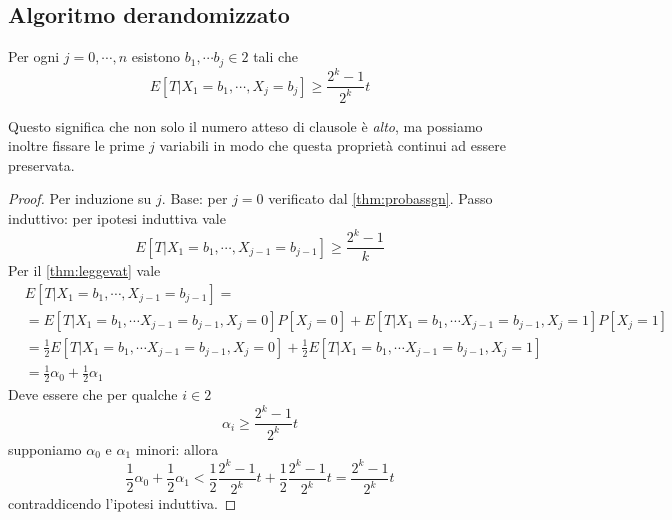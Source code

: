 \subsection{Algoritmo derandomizzato}
\begin{theorem}\label{thm:maxsatderandomexv}
	Per ogni $j  = 0, \cdots, n$ esistono $b_1, \cdots b_j \in 2$ tali che
	$$
		E[T|X_1 = b_1, \cdots, X_j = b_j] \geq \frac{2^k-1}{2^k}t
	$$
\end{theorem}
Questo significa che non solo il numero atteso di clausole è \textit{alto}, ma
possiamo inoltre fissare le prime $j$ variabili in modo che questa proprietà
continui ad essere preservata.
\begin{proof}
	Per induzione su $j$.
	Base: per $j = 0$ verificato dal \cref{thm:probassgn}.
	Passo induttivo: per ipotesi induttiva vale
	$$
		E[T|X_1 = b_1, \cdots, X_{j-1} = b_{j-1}] \geq \frac{2^k-1}{k}
	$$
	Per il \cref{thm:leggevat} vale
	\begin{align*}
		 & E[T|X_1 = b_1, \cdots, X_{j-1} = b_{j-1}] =                         \\
		 & = E[T | X_1 = b_1, \cdots X_{j-1} = b_{j-1}, X_j = 0]P[X_j = 0] +
		E[T | X_1 = b_1, \cdots X_{j-1} = b_{j-1}, X_j = 1]P[X_j = 1]          \\
		 & = \frac{1}{2} E[T | X_1 = b_1, \cdots X_{j-1} = b_{j-1}, X_j = 0] +
		\frac{1}{2} E[T | X_1 = b_1, \cdots X_{j-1} = b_{j-1}, X_j = 1]        \\
		 & = \frac{1}{2} \alpha_0 + \frac{1}{2} \alpha_1
	\end{align*}
	Deve essere che per qualche $i \in 2$
	$$
		\alpha_i \geq \frac{2^k -1 }{2^k} t
	$$
	supponiamo $\alpha_0$ e $\alpha_1$ minori: allora
	$$
		\frac{1}{2} \alpha_0 + \frac{1}{2} \alpha_1 < \frac{1}{2}\frac{2^k -1 }{2^k} t + \frac{1}{2} \frac{2^k -1 }{2^k} t = \frac{2^k -1 }{2^k} t
	$$
	contraddicendo l'ipotesi induttiva.
\end{proof}

